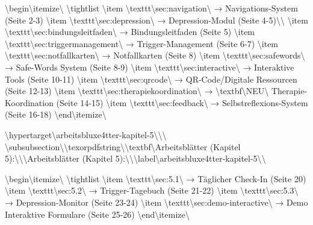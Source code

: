\textbackslash{}begin\textbackslash{}{itemize\textbackslash{}}
\textbackslash{}tightlist
\textbackslash{}item
  \textbackslash{}texttt\textbackslash{}{sec:navigation\textbackslash{}} → Navigations-System (Seite 2-3)
\textbackslash{}item
  \textbackslash{}texttt\textbackslash{}{sec:depression\textbackslash{}} → Depression-Modul (Seite 4-5)\textbackslash{}\textbackslash{}
\textbackslash{}item
  \textbackslash{}texttt\textbackslash{}{sec:bindungsleitfaden\textbackslash{}} → Bindungsleitfaden (Seite 5)
\textbackslash{}item
  \textbackslash{}texttt\textbackslash{}{sec:triggermanagement\textbackslash{}} → Trigger-Management (Seite 6-7)
\textbackslash{}item
  \textbackslash{}texttt\textbackslash{}{sec:notfallkarten\textbackslash{}} → Notfallkarten (Seite 8)
\textbackslash{}item
  \textbackslash{}texttt\textbackslash{}{sec:safewords\textbackslash{}} → Safe-Words System (Seite 8-9)
\textbackslash{}item
  \textbackslash{}texttt\textbackslash{}{sec:interactive\textbackslash{}} → Interaktive Tools (Seite 10-11)
\textbackslash{}item
  \textbackslash{}texttt\textbackslash{}{sec:qrcode\textbackslash{}} → QR-Code/Digitale Ressourcen (Seite 12-13)
\textbackslash{}item
  \textbackslash{}texttt\textbackslash{}{sec:therapiekoordination\textbackslash{}} → \textbackslash{}textbf\textbackslash{}{NEU\textbackslash{}} Therapie-Koordination (Seite 14-15)
\textbackslash{}item
  \textbackslash{}texttt\textbackslash{}{sec:feedback\textbackslash{}} → Selbstreflexions-System (Seite 16-18)
\textbackslash{}end\textbackslash{}{itemize\textbackslash{}}

\textbackslash{}hypertarget\textbackslash{}{arbeitsbluxe4tter-kapitel-5\textbackslash{}}\textbackslash{}{\textbackslash{}%
\textbackslash{}subsubsection\textbackslash{}{\textbackslash{}texorpdfstring\textbackslash{}{\textbackslash{}textbf\textbackslash{}{Arbeitsblätter (Kapitel 5):\textbackslash{}}\textbackslash{}}\textbackslash{}{Arbeitsblätter (Kapitel 5):\textbackslash{}}\textbackslash{}}\textbackslash{}label\textbackslash{}{arbeitsbluxe4tter-kapitel-5\textbackslash{}}\textbackslash{}}

\textbackslash{}begin\textbackslash{}{itemize\textbackslash{}}
\textbackslash{}tightlist
\textbackslash{}item
  \textbackslash{}texttt\textbackslash{}{sec:5.1\textbackslash{}} → Täglicher Check-In (Seite 20)
\textbackslash{}item
  \textbackslash{}texttt\textbackslash{}{sec:5.2\textbackslash{}} → Trigger-Tagebuch (Seite 21-22)
\textbackslash{}item
  \textbackslash{}texttt\textbackslash{}{sec:5.3\textbackslash{}} → Depression-Monitor (Seite 23-24)
\textbackslash{}item
  \textbackslash{}texttt\textbackslash{}{sec:demo-interactive\textbackslash{}} → Demo Interaktive Formulare (Seite 25-26)
\textbackslash{}end\textbackslash{}{itemize\textbackslash{}}


